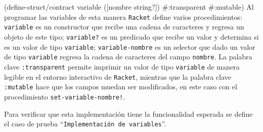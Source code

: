 \documentclass[10pt,oneside,openany,letterpaper]{book}
\begin{document}
\nwenddocs{}\endmoddef
(define-struct/contract variable
  ([nombre string?])
  #:transparent
  #:mutable)
\eatline
{}\nwendcode{}\nwdocspar
Al programar las variables de esta manera {\tt{}Racket} define varios procedimientos: {\tt{}\protect{}variable} es un constructor que recibe una cadena de caracteres y regresa un objeto de este tipo; {\tt{}\protect{}variable?} es un predicado que recibe un valor y determina si es un valor de tipo {\tt{}\protect{}variable}; {\tt{}\protect{}variable-nombre} es un selector que dado un valor de tipo {\tt{}\protect{}variable} regresa la cadena de caracteres del campo {\tt{}nombre}. La palabra clave {\tt{}{}:transparent} permite imprimir un valor de tipo {\tt{}\protect{}variable} de manera legible en el entorno interactivo de {\tt{}Racket}, mientras que la palabra clave {\tt{}{}:mutable} hace que los campos muedan ser modificados, en este caso con el procedimiento {\tt{}set-\protect{}variable-nombre!}.

Para verificar que esta implementación tiene la funcionalidad esperada se define el caso de prueba ``{\tt{}Implementación\ de\ variables}''.
\end{document}
